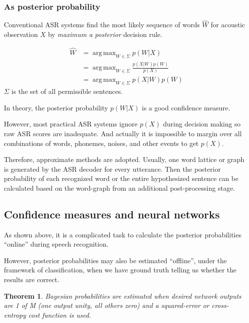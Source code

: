 \documentclass[11pt,a4paper]{report}
\DeclareMathOperator*{\argmax}{arg\,max}
\newtheorem*{theorem}{Theorem}
\begin{document}
\subsubsection{As posterior probability}

Conventional ASR systems find the most likely sequence of words \(\hat{W}\) for acoustic observation \(X\) by \textit{maximum a posterior} decision rule.

\begin{equation}
  \begin{split}
    \hat{W} & = \argmax_{W \in \Sigma} p(W|X) \\
      & = \argmax_{W \in \Sigma} \frac{p(X|W) p(W)}{p(X)} \\
      & = \argmax_{W \in \Sigma} p(X|W) p(W)
  \end{split}
\end{equation}
\(\Sigma\) is the set of all permissible sentences.

In theory, the posterior probability \(p(W|X)\) is a good confidence measure.

However, most practical ASR systems ignore \(p(X)\) during decision making so raw ASR scores are inadequate.
And actually it is impossible to margin over all combinations of words, phonemes, noises, and other events to get \(p(X)\).

Therefore, approximate methods are adopted.
Usually, one word lattice or graph is generated by the ASR decoder for every utterance.
Then the posterior probability of each recognized word or the entire hypothesized sentence can be calculated based on the word-graph from an additional post-processing stage.

\subsection{Confidence measures and neural networks}

As shown above, it is a complicated task to calculate the posterior probabilities \enquote{online} during speech recognition.

However, posterior probabilities may also be estimated \enquote{offline}, under the framework of classification, when we have ground truth telling us whether the results are correct.

\bigskip

\begin{mdframed}
\begin{theorem}
  Bayesian probabilities are estimated when desired network outputs are 1 of M (one output unity, all others zero) and a squared-error or cross-entropy cost function is used. \parencite{richard1991neural}
\end{theorem}
\end{mdframed}
\end{document}
